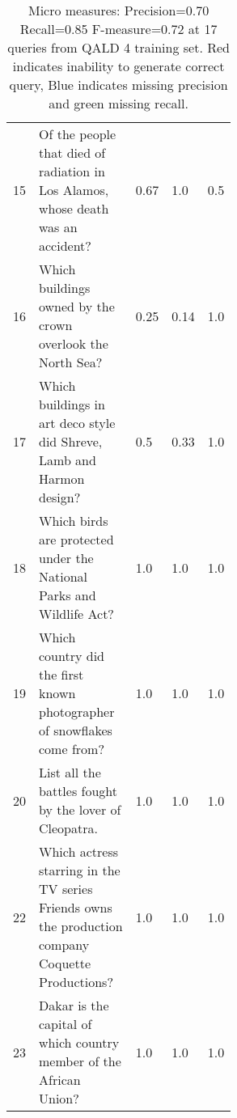 \begin{table}[htb!]
{\begin{tabular}{@{\extracolsep{\fill} } @{}lp{0.55\linewidth}lll@{}}
\rowcolor[HTML]{9AFF99} 
15          & Of the people that died of radiation in Los Alamos, whose death was an accident?                  & 0.67               & 1.0                & 0.5             \\
\rowcolor[HTML]{BBDAFF} 
16          & Which buildings owned by the crown overlook the North Sea?                                        & 0.25               & 0.14               & 1.0             \\
\rowcolor[HTML]{BBDAFF} 
17          & Which buildings in art deco style did Shreve, Lamb and Harmon design?                             & 0.5                & 0.33               & 1.0             \\
18          & Which birds are protected under the National Parks and Wildlife Act?                              & 1.0                & 1.0                & 1.0             \\
19          & Which country did the first known photographer of snowflakes come from?                           & 1.0                & 1.0                & 1.0             \\
20          & List all the battles fought by the lover of Cleopatra.                                            & 1.0                & 1.0                & 1.0             \\
22          & Which actress starring in the TV series Friends owns the production company Coquette Productions? & 1.0                & 1.0                & 1.0             \\
23          & Dakar is the capital of which country member of the African Union?                                & 1.0                & 1.0                & 1.0             \\ \bottomrule
\end{tabular}}
\caption[QALD 4 training set performance.]{Micro measures: Precision=0.70 Recall=0.85 F-measure=0.72 at 17 queries from QALD 4 training set. Red indicates inability to generate correct query, Blue indicates missing precision and green missing recall.}
\label{tab:trainqueries}

\end{table}